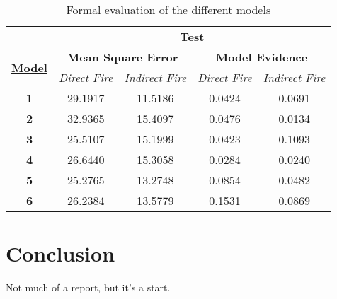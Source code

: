 \documentclass[a4paper,11pt]{report}
\begin{document}
\begin{table}[]
\centering
\caption{Formal evaluation of the different models}
\label{model-comparison}
\begin{tabular}{ccccc}
\multicolumn{1}{l}{}                                       & \multicolumn{4}{c}{{\ul \textbf{Test}}}                                                                                                                                           \\
\multicolumn{1}{c|}{\multirow{2}{*}{{\ul \textbf{Model}}}} & \multicolumn{2}{c|}{\textbf{Mean Square Error}}                                         & \multicolumn{2}{c}{\textbf{Model Evidence}}                                                         \\
\multicolumn{1}{c|}{}                                      & \multicolumn{1}{c|}{\textit{Direct Fire}} & \multicolumn{1}{c|}{\textit{Indirect Fire}} & \multicolumn{1}{c|}{\textit{Direct Fire}} & \multicolumn{1}{c}{\textit{Indirect Fire}} \\ \hline
\multicolumn{1}{c|}{\textbf{1}}                    & \multicolumn{1}{c|}{29.1917}              & \multicolumn{1}{c|}{11.5186}                & \multicolumn{1}{c|}{0.0424}               & \multicolumn{1}{c}{0.0691}                 \\ \hline
\multicolumn{1}{c|}{\textbf{2}}            & \multicolumn{1}{c|}{32.9365}              & \multicolumn{1}{c|}{15.4097}                & \multicolumn{1}{c|}{0.0476}               & \multicolumn{1}{c}{0.0134}                 \\ \hline
\multicolumn{1}{c|}{\textbf{3}}    & \multicolumn{1}{c|}{25.5107}              & \multicolumn{1}{c|}{15.1999}                & \multicolumn{1}{c|}{0.0423}               & \multicolumn{1}{c}{0.1093}                 \\ \hline
\multicolumn{1}{c|}{\textbf{4}}            & \multicolumn{1}{c|}{26.6440}              & \multicolumn{1}{c|}{15.3058}                & \multicolumn{1}{c|}{0.0284}               & \multicolumn{1}{c}{0.0240}                 \\ \hline
\multicolumn{1}{c|}{\textbf{5}}    & \multicolumn{1}{c|}{25.2765}              & \multicolumn{1}{c|}{13.2748}                & \multicolumn{1}{c|}{0.0854}               & \multicolumn{1}{c}{0.0482}                 \\ \hline
\multicolumn{1}{c|}{\textbf{6}}    & \multicolumn{1}{c|}{26.2384}              & \multicolumn{1}{c|}{13.5779}                & \multicolumn{1}{c|}{0.1531}               & \multicolumn{1}{c}{0.0869}                 \\ \hline
\end{tabular}
\end{table}



\chapter{Conclusion}
Not much of a report, but it's a start.

\singlespacing 

\newpage



\end{document}
